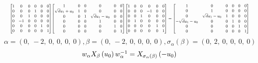 \documentclass[11pt]{article}
\theoremstyle{definition}
\begin{document}
\[
\scaletoalign{\textwidth}{{\left[\begin{matrix}1 & 0 & 0 & 0 & 0 & 0\\0 & 0 & 0 & 1 & 0 & 0\\0 & 0 & 1 & 0 & 0 & 0\\0 & -1 & 0 & 0 & 0 & 0\\0 & 0 & 0 & 0 & 1 & 0\\0 & 0 & 0 & 0 & 0 & 1\end{matrix}\right]} {\left[\begin{matrix}1 & 0 & 0 & 0 & 0 & 0\\\sqrt{d} u_{1} + u_{0} & 1 & 0 & 0 & 0 & 0\\0 & 0 & 1 & \sqrt{d} u_{1} - u_{0} & 0 & 0\\0 & 0 & 0 & 1 & 0 & 0\\0 & 0 & 0 & 0 & 1 & 0\\0 & 0 & 0 & 0 & 0 & 1\end{matrix}\right]} {\left[\begin{matrix}1 & 0 & 0 & 0 & 0 & 0\\0 & 0 & 0 & -1 & 0 & 0\\0 & 0 & 1 & 0 & 0 & 0\\0 & 1 & 0 & 0 & 0 & 0\\0 & 0 & 0 & 0 & 1 & 0\\0 & 0 & 0 & 0 & 0 & 1\end{matrix}\right]} = {\left[\begin{matrix}1 & 0 & 0 & 0 & 0 & 0\\0 & 1 & 0 & 0 & 0 & 0\\0 & \sqrt{d} u_{1} - u_{0} & 1 & 0 & 0 & 0\\- \sqrt{d} u_{1} - u_{0} & 0 & 0 & 1 & 0 & 0\\0 & 0 & 0 & 0 & 1 & 0\\0 & 0 & 0 & 0 & 0 & 1\end{matrix}\right]}}
\]
\[
\alpha = \left( 0, \  -2, \  0, \  0, \  0, \  0\right), \beta = \left( 0, \  -2, \  0, \  0, \  0, \  0\right), \sigma_{\alpha}(\beta) = \left( 0, \  2, \  0, \  0, \  0, \  0\right)
\]
\[
\scaletoalign{\textwidth}{w_{\alpha} X_{\beta}\left(u_{0}\right) w_{\alpha}^{-1} = X_{\sigma_{\alpha}\left(\beta\right)}\left(- u_{0}\right)}
\]
\end{document}

